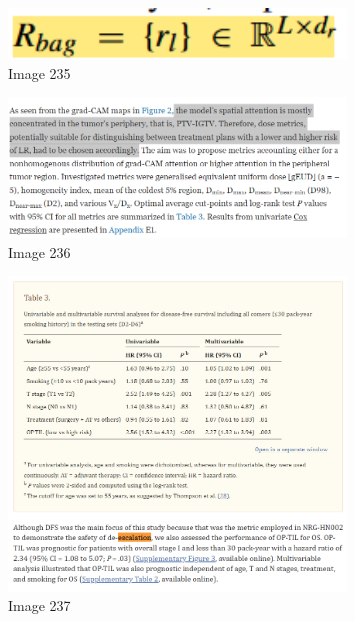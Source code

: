 \documentclass{article}%
\begin{document}
%


\begin{figure}[h!]%
\centering%
\includegraphics[width=0.8\textwidth]{images/image234.png}%
\caption{Image 235}%
\end{figure}

%


\begin{figure}[h!]%
\centering%
\includegraphics[width=0.8\textwidth]{images/image235.png}%
\caption{Image 236}%
\end{figure}

%


\begin{figure}[h!]%
\centering%
\includegraphics[width=0.8\textwidth]{images/image236.png}%
\caption{Image 237}%
\end{figure}

%
\end{document}
